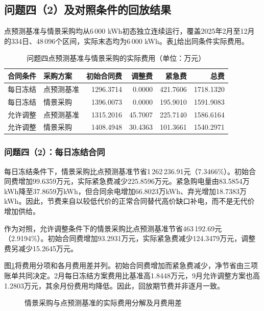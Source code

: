\subsection{问题四（2）及对照条件的回放结果}
点预测基准与情景采购均从6\,000 kWh初态独立连续运行，覆盖2025年2月至12月的334日、48\,096个区间，实际末态均为6\,000 kWh。表\ref{tab:q4-annual}给出同条件实际费用。
\begin{table}[H]\centering\small
\caption{问题四点预测基准与情景采购的实际费用（单位：万元）}\label{tab:q4-annual}
\begin{tabular}{llrrrr}\toprule
合同条件 & 采购方案 & 初始合同费 & 调整费 & 紧急费 & 总费 \\ \midrule
每日冻结 & 点预测基准 & 1296.3714 & 0.0000 & 421.7606 & 1718.1320 \\
每日冻结 & 情景采购 & 1396.0073 & 0.0000 & 195.9010 & 1591.9083 \\
\midrule
允许调整 & 点预测基准 & 1315.2016 & 45.7007 & 225.7140 & 1586.6164 \\
允许调整 & 情景采购 & 1408.4948 & 30.4363 & 101.3661 & 1540.2971 \\
\bottomrule\end{tabular}\end{table}

\subsubsection{问题四（2）：每日冻结合同}
每日冻结条件下，情景采购比点预测基准节省1\,262\,236.91元（7.3466\%）。初始合同费增加99.6359万元，实际紧急费减少225.8596万元。紧急购电量由83.5854万kWh降至37.8659万kWh，但合同余电增加66.8023万kWh、弃光增加18.7383万kWh。因此，节费来自以较低代价的正常合同替代高价缺口补电，而不是无代价增加供给。

作为对照，允许调整条件下的情景采购比点预测基准节省463\,192.69元（2.9194\%）。初始合同费增加93.2931万元，实际紧急费减少124.3479万元，调整费另减少15.2645万元。

图\ref{fig:q4-procurement}将费用分项和各月费用差并列。初始合同费增加而紧急费减少，净节省由三项账单共同决定。2月每日冻结方案费用比基准高1.8448万元，9月允许调整方案也高1.2803万元，其余月份费用均降低。因此，回放期节费并非逐月一致。
\begin{figure}[H]\centering
{}
\caption{情景采购与点预测基准的实际费用分解及月费用差}\label{fig:q4-procurement}
\end{figure}

